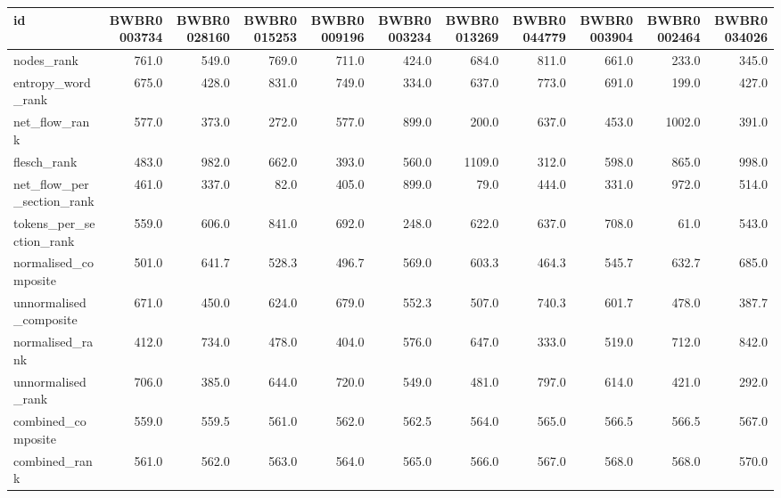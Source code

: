 \begin{tabular}{lrrrrrrrrrr}
\toprule
id & BWBR0003734 & BWBR0028160 & BWBR0015253 & BWBR0009196 & BWBR0003234 & BWBR0013269 & BWBR0044779 & BWBR0003904 & BWBR0002464 & BWBR0034026 \\
\midrule
nodes\_rank & 761.0 & 549.0 & 769.0 & 711.0 & 424.0 & 684.0 & 811.0 & 661.0 & 233.0 & 345.0 \\
\cline{1-11}
entropy\_word\_rank & 675.0 & 428.0 & 831.0 & 749.0 & 334.0 & 637.0 & 773.0 & 691.0 & 199.0 & 427.0 \\
\cline{1-11}
net\_flow\_rank & 577.0 & 373.0 & 272.0 & 577.0 & 899.0 & 200.0 & 637.0 & 453.0 & 1002.0 & 391.0 \\
\cline{1-11}
flesch\_rank & 483.0 & 982.0 & 662.0 & 393.0 & 560.0 & 1109.0 & 312.0 & 598.0 & 865.0 & 998.0 \\
\cline{1-11}
net\_flow\_per\_section\_rank & 461.0 & 337.0 & 82.0 & 405.0 & 899.0 & 79.0 & 444.0 & 331.0 & 972.0 & 514.0 \\
\cline{1-11}
tokens\_per\_section\_rank & 559.0 & 606.0 & 841.0 & 692.0 & 248.0 & 622.0 & 637.0 & 708.0 & 61.0 & 543.0 \\
\cline{1-11}
normalised\_composite & 501.0 & 641.7 & 528.3 & 496.7 & 569.0 & 603.3 & 464.3 & 545.7 & 632.7 & 685.0 \\
\cline{1-11}
unnormalised\_composite & 671.0 & 450.0 & 624.0 & 679.0 & 552.3 & 507.0 & 740.3 & 601.7 & 478.0 & 387.7 \\
\cline{1-11}
normalised\_rank & 412.0 & 734.0 & 478.0 & 404.0 & 576.0 & 647.0 & 333.0 & 519.0 & 712.0 & 842.0 \\
\cline{1-11}
unnormalised\_rank & 706.0 & 385.0 & 644.0 & 720.0 & 549.0 & 481.0 & 797.0 & 614.0 & 421.0 & 292.0 \\
\cline{1-11}
combined\_composite & 559.0 & 559.5 & 561.0 & 562.0 & 562.5 & 564.0 & 565.0 & 566.5 & 566.5 & 567.0 \\
\cline{1-11}
combined\_rank & 561.0 & 562.0 & 563.0 & 564.0 & 565.0 & 566.0 & 567.0 & 568.0 & 568.0 & 570.0 \\
\cline{1-11}
\bottomrule
\end{tabular}
